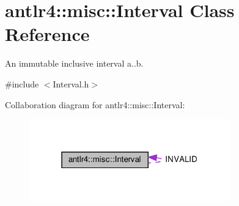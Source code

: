 \hypertarget{classantlr4_1_1misc_1_1Interval}{}\section{antlr4\+:\+:misc\+:\+:Interval Class Reference}
\label{classantlr4_1_1misc_1_1Interval}


An immutable inclusive interval a..b.  




{\ttfamily \#include $<$Interval.\+h$>$}



Collaboration diagram for antlr4\+:\+:misc\+:\+:Interval\+:
\nopagebreak
\begin{figure}[H]
\begin{center}
\leavevmode
\includegraphics[width=247pt]{classantlr4_1_1misc_1_1Interval__coll__graph}
\end{center}
\end{figure}
